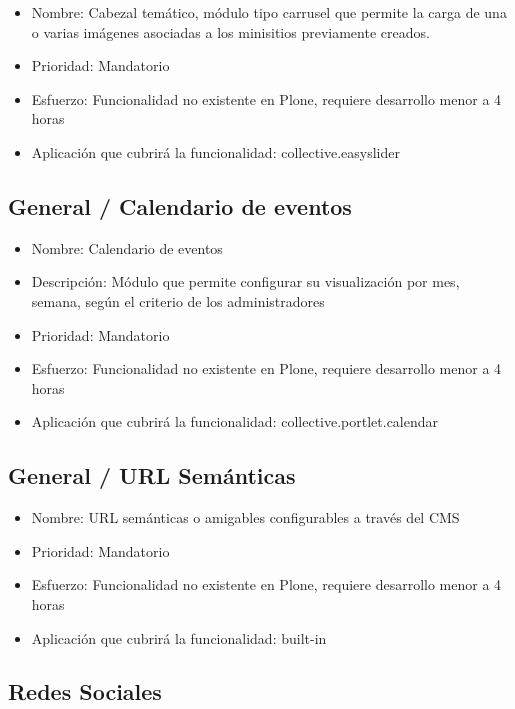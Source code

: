 \documentclass[11pt, letterpaper, oneside, spanish]{scrbook}
\begin{document}
\begin{itemize}
\item Nombre: Cabezal temático, módulo tipo carrusel que permite la carga de una o
  varias imágenes asociadas a los minisitios previamente creados.
\item Prioridad: Mandatorio
\item Esfuerzo: Funcionalidad no existente en Plone, requiere desarrollo menor a 4
  horas
\item Aplicación que cubrirá la funcionalidad: collective.easyslider
\end{itemize}
\subsection{General / Calendario de eventos}
\label{sec-2-1-18}

\begin{itemize}
\item Nombre: Calendario de eventos
\item Descripción: Módulo que permite configurar su visualización por mes, semana,
  según el criterio de los administradores
\item Prioridad: Mandatorio
\item Esfuerzo: Funcionalidad no existente en Plone, requiere desarrollo menor a 4
  horas
\item Aplicación que cubrirá la funcionalidad: collective.portlet.calendar
\end{itemize}
\subsection{General / URL Semánticas}
\label{sec-2-1-19}

\begin{itemize}
\item Nombre: URL semánticas o amigables configurables a través del CMS
\item Prioridad: Mandatorio
\item Esfuerzo: Funcionalidad no existente en Plone, requiere desarrollo menor a 4
  horas
\item Aplicación que cubrirá la funcionalidad:  built-in
\end{itemize}
\subsection{Redes Sociales}
\label{sec-2-1-20}
\end{document}
